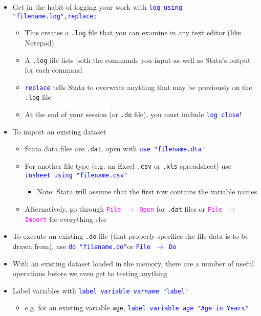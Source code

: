 \documentclass{article}
\begin{document}
\begin{itemize}
	\item Get in the habit of logging your work with \textcolor{blue}{\texttt{log using "filename.log",replace;}}
		\begin{itemize}
			\item This creates a \texttt{.log} file that you can examine in any text editor (like Notepad) 
			\item A \texttt{.log} file lists both the commands you input as well as Stata's output for each command
			\item \textcolor{blue}{\texttt{replace}} tells Stata to overwrite anything that may be previously on the \texttt{.log} file
			\item At the end of your session (or \texttt{.do} file), you must include \textcolor{blue}{\texttt{log close}}!
		\end{itemize}
		\item To import an existing dataset
			\begin{itemize}
				\item Stata data files are \texttt{.dat}, open with \textcolor{blue}{\texttt{use "filename.dta"}}
				\item For another file type (e.g. an Excel \texttt{.csv} or \texttt{.xls} spreadsheet)  use \textcolor{blue}{\texttt{insheet using "filename.csv"}}
					\begin{itemize}
						\item Note: Stata will assume that the first row contains the variable names 
					\end{itemize}
				\item Alternatively, go through \textcolor{magenta}{\texttt{File $\rightarrow$ Open}} for \texttt{.dat} files or  \textcolor{magenta}{\texttt{File $\rightarrow$ Import}} for everything else
			\end{itemize}	
		\item To execute an existing \texttt{.do} file (that properly specifies the file data is to be drawn from), use \textcolor{blue}{\texttt{do "filename.do"}}or \textcolor{blue}{\texttt{File $\rightarrow$ Do}}
		\item With an existing dataset loaded in the memory, there are a number of useful operations before we even get to testing anything
		\item Label variables with \textcolor{blue}{\texttt{label variable \emph{varname} "label"}}
			\begin{itemize}
				\item e.g. for an existing variable \texttt{age},  \textcolor{blue}{\texttt{label variable age "Age in Years"}}
			\end{itemize}
\end{itemize}
\end{document}

